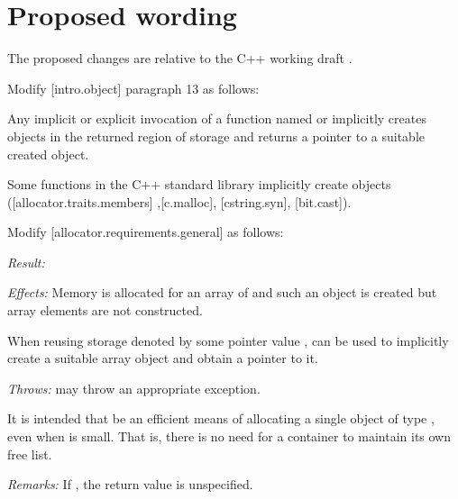 
\section{Proposed wording}
\label{sec:wording}

The proposed changes are relative to the C++ working draft \cite{N4910}. 

Modify [intro.object] paragraph 13 as follows:

\begin{adjustwidth}{0.5cm}{0.5cm}
Any implicit or explicit invocation of a function
named  or 
implicitly creates objects in the returned region of storage and
returns a pointer to a suitable created object.
\begin{note}
Some functions in the C++ standard library implicitly create objects ([allocator.traits.members] ,[c.malloc], [cstring.syn], [bit.cast]).
\end{note}

\end{adjustwidth}

Modify [allocator.requirements.general] as follows:

\begin{adjustwidth}{0.5cm}{0.5cm}

\emph{Result: }

\emph{Effects: }
Memory is allocated for an array of  
and such an object is created
but array elements are not constructed.
\begin{example}
When reusing storage denoted by some pointer value ,
can be used to implicitly create a suitable array object
and obtain a pointer to it.
\end{example}

\emph{Throws:}
 may throw an appropriate exception.

\begin{note}
It is intended that  be an efficient means
of allocating a single object of type , even when 
is small. That is, there is no need for a container to maintain its own
free list.
\end{note}

\emph{Remarks:}
If , the return value is unspecified.
\end{adjustwidth}

